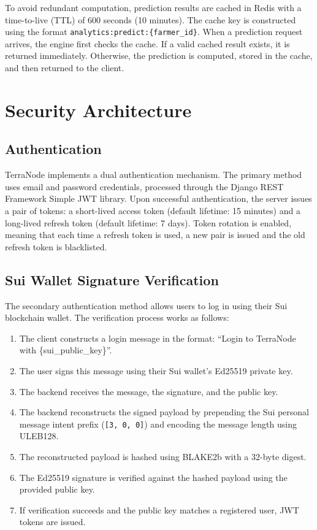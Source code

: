To avoid redundant computation, prediction results are cached in Redis with a time-to-live (TTL) of 600 seconds (10 minutes). The cache key is constructed using the format \texttt{analytics:predict:\{farmer\_id\}}. When a prediction request arrives, the engine first checks the cache. If a valid cached result exists, it is returned immediately. Otherwise, the prediction is computed, stored in the cache, and then returned to the client.

\section{Security Architecture}

\subsection{Authentication}

TerraNode implements a dual authentication mechanism. The primary method uses email and password credentials, processed through the Django REST Framework Simple JWT library. Upon successful authentication, the server issues a pair of tokens: a short-lived access token (default lifetime: 15 minutes) and a long-lived refresh token (default lifetime: 7 days). Token rotation is enabled, meaning that each time a refresh token is used, a new pair is issued and the old refresh token is blacklisted.

\subsection{Sui Wallet Signature Verification}
\label{sec:wallet_verify}

The secondary authentication method allows users to log in using their Sui blockchain wallet. The verification process works as follows:

\begin{enumerate}
    \item The client constructs a login message in the format: ``Login to TerraNode with \{sui\_public\_key\}''.
    \item The user signs this message using their Sui wallet's Ed25519 private key.
    \item The backend receives the message, the signature, and the public key.
    \item The backend reconstructs the signed payload by prepending the Sui personal message intent prefix (\texttt{[3, 0, 0]}) and encoding the message length using ULEB128.
    \item The reconstructed payload is hashed using BLAKE2b with a 32-byte digest.
    \item The Ed25519 signature is verified against the hashed payload using the provided public key.
    \item If verification succeeds and the public key matches a registered user, JWT tokens are issued.
\end{enumerate}

